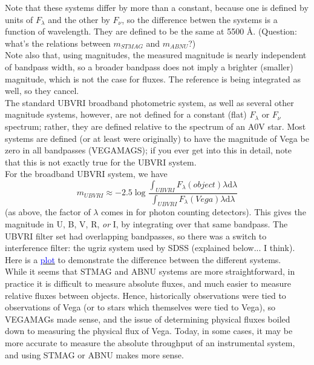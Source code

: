 \documentclass[12pt]{article}
\begin{document}
\noindent Note that these systems differ by more than a constant,
because one is defined by units of $F_{\lambda}$ and the other by
$F_{\nu}$, so the difference betwen the systems is a function of
wavelength. They are defined to be the same at 5500 \AA{}. (Question:
what's the relations between $m_{STMAG}$ and $m_{ABNU}$?)\\

\noindent Note also that, using magnitudes, the measured magnitude is
nearly independent of bandpass width, so a broader bandpass does not
imply a brighter (smaller) magnitude, which is not the case for
fluxes. The reference is being integrated as well, so they cancel.\\

\noindent The standard UBVRI broadband photometric system, as well as
several other magnitude systems, however, are not defined for a
constant (flat) $F_{\lambda}$ or $F_{\nu}$ spectrum; rather, they are defined
relative to the spectrum of an A0V star. Most systems are defined (or
at least were originally) to have the magnitude of Vega be zero in all
bandpasses (VEGAMAGS); if you ever get into this in detail, note that
this is not exactly true for the UBVRI system.\\

\noindent For the broadband UBVRI system, we have
\begin{equation*}
    m_{UBVRI} \approx -2.5 \log
    \frac{\int_{UBVRI}F_{\lambda}(object)\lambda\textrm{d}\lambda}
    {\int_{UBVRI}F_{\lambda}(Vega)\lambda\textrm{d}\lambda}
\end{equation*}
(as above, the factor of $\lambda$ comes in for photon counting
detectors). This gives the magnitude in U, B, V, R, \emph{or} I,
by integrating over that same bandpass.
The UBVRI filter set had overlapping bandpasses, so
there was a switch to interference filter: the ugriz system used
by SDSS (explained below... I think).\\

\noindent Here is a
\href{http://astronomy.nmsu.edu/holtz/a535/html/diagrams/a535/mag.htm}
{\textcolor{blue}{plot}}
to demonstrate the difference between the different systems.\\

\noindent While it seems that STMAG and ABNU systems are more
straightforward, in practice it is difficult to measure absolute
fluxes, and much easier to measure relative fluxes between objects.
Hence, historically observations were tied to observations of Vega (or
to stars which themselves were tied to Vega), so VEGAMAGs made sense,
and the issue of determining physical fluxes boiled down to measuring
the physical flux of Vega. Today, in some cases, it may be more
accurate to measure the absolute throughput of an instrumental system,
and using STMAG or ABNU makes more sense.
\end{document}
